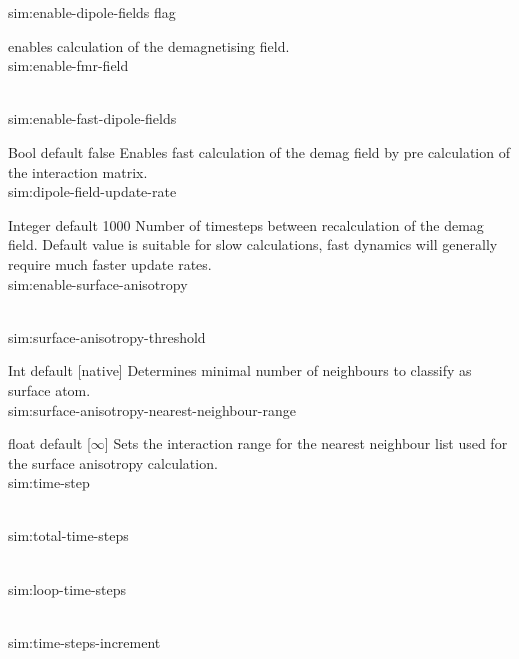 
{\zicf sim:enable-dipole-fields flag} enables calculation of the demagnetising field.\\
     
{\zicf   sim:enable-fmr-field}\\
  
{\zicf   sim:enable-fast-dipole-fields}
     Bool default false
     Enables fast calculation of the demag field by pre calculation of the interaction matrix.\\ 

{\zicf sim:dipole-field-update-rate}
   Integer default 1000
   Number of timesteps between recalculation of the demag field. Default value is suitable for slow calculations, fast dynamics will generally require much faster update rates.\\
   
{\zicf  sim:enable-surface-anisotropy}\\
    
{\zicf sim:surface-anisotropy-threshold}
  Int default [native]
  Determines minimal number of neighbours to classify as surface atom.\\

{\zicf sim:surface-anisotropy-nearest-neighbour-range}
  float default [$\infty$]
  Sets the interaction range for the nearest neighbour list used for the surface anisotropy calculation.\\  

{\zicf sim:time-step}\\

{\zicf sim:total-time-steps}\\

{\zicf sim:loop-time-steps}\\

{\zicf sim:time-steps-increment}\\

